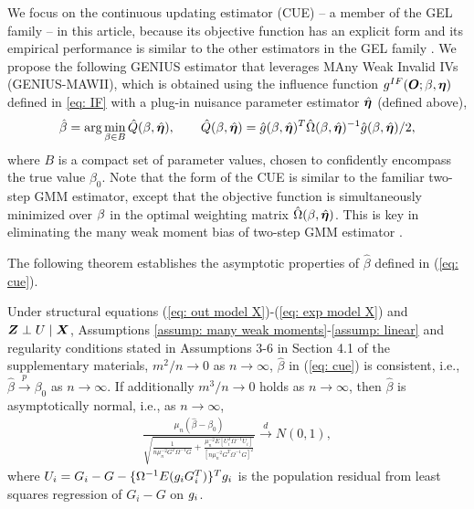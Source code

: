 \documentclass[12pt]{article}
\begin{document}
 We focus on the continuous updating estimator (CUE) -- a member of the  GEL family -- in this article, because its objective function has an explicit form and its empirical performance is similar to the other estimators in the GEL family \citep{Newey:2004aa}. We propose the following GENIUS estimator that leverages MAny Weak Invalid IVs (GENIUS-MAWII), which is obtained using the influence function  $ g^{IF} (\bm O; { \beta}, \bm \eta) $ defined in \eqref{eq: IF} with a  plug-in nuisance parameter  estimator $ \hat{\bm \eta} $ (defined above),
\begin{align}
	\hat{{ \beta}}=\arg\min_{\beta\in B} \hat{Q} ({ \beta}, \hat{\bm \eta}), \qquad \hat{Q}({ \beta}, \hat{\bm \eta})=\hat{g}({ \beta}, \hat{\bm \eta})^T \hat{\Omega} ({ \beta}, \hat{\bm \eta})^{-1} \hat{g}({ \beta}, \hat{\bm \eta})/2, \label{eq: cue}
\end{align}
where $B$ is a compact set of parameter values, {chosen to confidently encompass the true value $\beta_0$}. Note that the form of the CUE is similar to the familiar two-step GMM estimator, except that the objective function is simultaneously minimized over $ { \beta} $ in the optimal weighting matrix $ \hat{\Omega} ({ \beta}, \hat {\bm \eta}) $. This is key in eliminating the many weak moment bias of two-step GMM estimator \citep{Newey:2009aa}. 







The following theorem establishes the asymptotic properties of $ \hat{\beta} $ defined in (\ref{eq: cue}). 


\begin{theorem} \label{theo: GMM}
	Under structural equations (\ref{eq: out model X})-(\ref{eq: exp model X}) and $ \bm{Z}\perp U\mid \bm{X} $, Assumptions \ref{assump: many weak moments}-\ref{assump: linear} and regularity conditions {stated in Assumptions 3-6} in Section 4.1 of the supplementary materials, $ m^2/n\rightarrow 0 $ as $n\to \infty$, $ \hat{\beta} $ in (\ref{eq: cue}) is consistent, i.e., $ \hat{\beta}\xrightarrow{p} \beta_0 $ as $n\to \infty$. If additionally $ m^3/n\rightarrow0 $ holds as $n\to \infty$, then $ \hat\beta $ is asymptotically normal, i.e., as $ n\rightarrow\infty $, 
	\begin{align}
		\frac{\mu_n(\hat{\beta}-\beta_{0})}{ \sqrt{ \frac{1}{ n \mu_n^{-2}  G^T\Omega^{-1} G}+  \frac{ \mu_n^{-2}E[U_i^T\Omega^{-1} U_i]}{[ n \mu_n^{-2} G^T\Omega^{-1} G]^2}  }} \xrightarrow{d} N\left(0, 1\right), \label{eq: CUE normality}
	\end{align}
	where $U_i=G_i-G-\{\Omega^{-1} E(g_i G_i^T)\} ^T g_i $ is the population residual from least squares regression of $G_i-G$ on $g_i$. 
\end{theorem}
\end{document}
